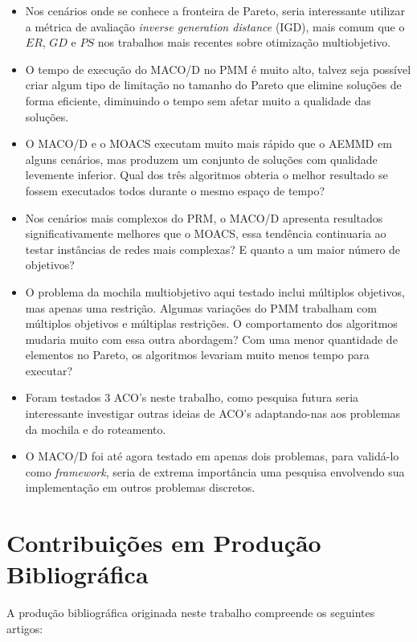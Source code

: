 \begin{itemize}
	\item Nos cenários onde se conhece a fronteira de Pareto, seria interessante utilizar a métrica de avaliação \textit{inverse generation distance} (IGD), mais comum que o $ER$, $GD$ e $PS$ nos trabalhos mais recentes sobre otimização multiobjetivo.
	\item O tempo de execução do MACO/D no PMM é muito alto, talvez seja possível criar algum tipo de limitação no tamanho do Pareto que elimine soluções de forma eficiente, diminuindo o tempo sem afetar muito a qualidade das soluções.
	\item O MACO/D e o MOACS executam muito mais rápido que o AEMMD em alguns cenários, mas produzem um conjunto de soluções com qualidade levemente inferior. Qual dos três algoritmos obteria o melhor resultado se fossem executados todos durante o mesmo espaço de tempo?
	\item Nos cenários mais complexos do PRM, o MACO/D apresenta resultados significativamente melhores que o MOACS, essa tendência continuaria ao testar instâncias de redes mais complexas? E quanto a um maior número de objetivos?
	\item O problema da mochila multiobjetivo aqui testado inclui múltiplos objetivos, mas apenas uma restrição. Algumas variações do PMM trabalham com múltiplos objetivos e múltiplas restrições. O comportamento dos algoritmos mudaria muito com essa outra abordagem? Com uma menor quantidade de elementos no Pareto, os algoritmos levariam muito menos tempo para executar?
	\item Foram testados 3 ACO's neste trabalho, como pesquisa futura seria interessante investigar outras ideias de ACO's adaptando-nas aos problemas da mochila e do roteamento.
	\item O MACO/D foi até agora testado em apenas dois problemas, para validá-lo como \textit{framework}, seria de extrema importância uma pesquisa envolvendo sua implementação em outros problemas discretos.
\end{itemize}

\section{Contribuições em Produção Bibliográfica}
A produção bibliográfica originada neste trabalho compreende os seguintes artigos:

